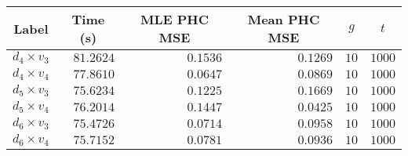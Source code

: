 \begin{tabular}{lrrrrr}
  \toprule
  \multicolumn{1}{c}{Label} & \multicolumn{1}{c}{Time (s)} & \multicolumn{1}{c}{MLE PHC MSE} & \multicolumn{1}{c}{Mean PHC MSE} & \multicolumn{1}{c}{$g$} & \multicolumn{1}{c}{$t$} \\
  \midrule
   $d_4 \times v_3$ &                    $81.2624$ &                        $0.1536$ &                         $0.1269$ &                    $10$ &                  $1000$ \\
   $d_4 \times v_4$ &                    $77.8610$ &                        $0.0647$ &                         $0.0869$ &                    $10$ &                  $1000$ \\
   $d_5 \times v_3$ &                    $75.6234$ &                        $0.1225$ &                         $0.1669$ &                    $10$ &                  $1000$ \\
   $d_5 \times v_4$ &                    $76.2014$ &                        $0.1447$ &                         $0.0425$ &                    $10$ &                  $1000$ \\
   $d_6 \times v_3$ &                    $75.4726$ &                        $0.0714$ &                         $0.0958$ &                    $10$ &                  $1000$ \\
   $d_6 \times v_4$ &                    $75.7152$ &                        $0.0781$ &                         $0.0936$ &                    $10$ &                  $1000$ \\
  \bottomrule
\end{tabular}
